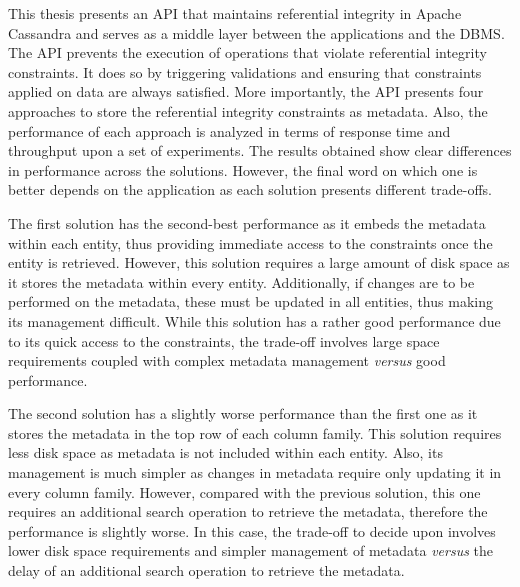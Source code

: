 This thesis presents an \ac{API} that maintains referential integrity in Apache
Cassandra and serves as a middle layer between the applications and the
\ac{DBMS}. The \ac{API} prevents the execution of operations that violate referential
integrity constraints. It
does so by triggering validations and ensuring that constraints applied on data
are always satisfied.
More importantly, the \ac{API} presents four approaches to
store the referential integrity constraints as metadata. Also, the
performance of each approach is analyzed in terms of response time and
throughput upon a set of experiments. The results obtained
show  clear differences in  performance across the solutions. However, the final
word on which one is better depends on the application as each solution
presents different trade-offs.


The first solution has the second-best performance as it embeds the metadata
within each entity, thus providing immediate access to the constraints once the
entity is retrieved. However, this solution requires a large amount of disk
space as it stores the metadata within every entity. Additionally, if changes
are to be performed on the metadata, these must be updated in all entities, thus
making its management difficult.
While this solution has a rather good performance due to its quick access to the
constraints, the trade-off  involves large space requirements
coupled with complex metadata management \textit{versus} good performance.


The second solution has a slightly worse performance than the first one as it
stores the metadata in the top row of each column family. This solution requires
less disk space as metadata is not included within each entity. Also,
its management is much simpler as changes in metadata  require only updating it
in every column family. However, compared with the previous solution,  this
one requires an additional search operation to retrieve the metadata, therefore  
the performance is slightly worse. In this case, the trade-off to decide upon
involves lower disk space requirements and simpler management  of metadata
\textit{versus} the delay of an additional search operation to retrieve the metadata.




